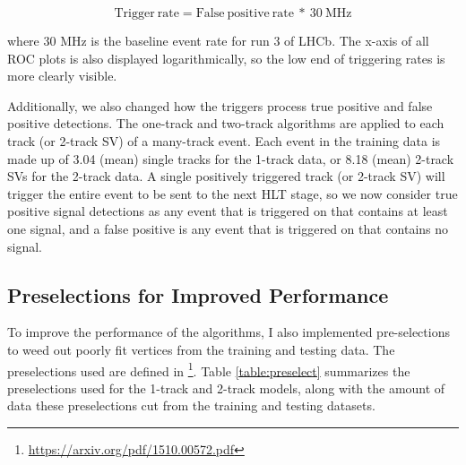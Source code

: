 \documentclass[12pt, letterpaper]{article}
\begin{document}
$$\mathrm{Trigger\: rate} = \mathrm{False\:positive\:rate} \:*\: \mathrm{30\: MHz}$$

where 30 MHz is the baseline event rate for run 3 of LHCb. The x-axis of all ROC plots is also displayed logarithmically, so the low end of triggering rates is more clearly visible.

Additionally, we also changed how the triggers process true positive and false positive detections. The one-track and two-track algorithms are applied to each track (or 2-track SV) of a many-track event. Each event in the training data is made up of 3.04 (mean) single tracks for the 1-track data, or 8.18 (mean) 2-track SVs for the 2-track data. A single positively triggered track (or 2-track SV) will trigger the entire event to be sent to the next HLT stage, so we now consider true positive signal detections as any event that is triggered on that contains at least one signal, and a false positive is any event that is triggered on that contains no signal.


\subsection{Preselections for Improved Performance}
To improve the performance of the algorithms, I also implemented pre-selections to weed out poorly fit vertices from the training and testing data. The preselections used are defined in \footnote{\url{https://arxiv.org/pdf/1510.00572.pdf}}. Table \ref{table:preselect} summarizes the preselections used for the 1-track and 2-track models, along with the amount of data these preselections cut from the training and testing datasets.
\end{document}
